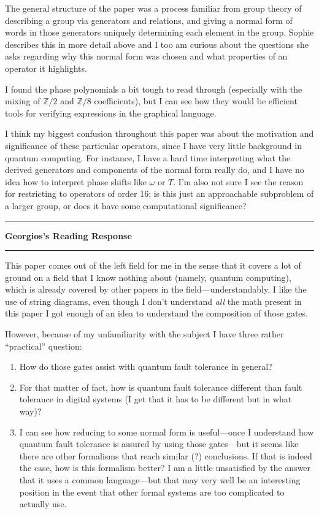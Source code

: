 \documentclass{amsart}
\newcommand{\iam}[1]{
  \vspace{0.25em}
  \hrule
  \vspace{0.25em}
  \textbf{{#1}'s Reading Response}
  \vspace{0.25em}
  \hrule
  \vspace{1em}
}
\begin{document}
The general structure of the paper was a process familiar from group theory of describing a group via generators and relations, and giving a normal form of words in those generators uniquely determining each element in the group.  Sophie describes this in more detail above and I too am curious about the questions she asks regarding why this normal form was chosen and what properties of an operator it highlights.

I found the phase polynomials a bit tough to read through (especially with the mixing of $\mathbb{Z}/2$ and $\mathbb{Z}/8$ coefficients), but I can see how they would be efficient tools for verifying expressions in the graphical language.

I think my biggest confusion throughout this paper was about the motivation and significance of these particular operators, since I have very little background in quantum computing.  For instance, I have a hard time interpreting what the derived generators and components of the normal form really do, and I have no idea how to interpret phase shifts like $\omega$ or $T$.  I'm also not sure I see the reason for restricting to operators of order 16; is this just an approachable subproblem of a larger group, or does it have some computational significance?

\iam{Georgios}

This paper comes out of the left field for me
in the sense that it covers a lot of ground
on a field that I know nothing about (namely, quantum computing),
which is already covered by other papers in the field---understandably.
I like the use of string diagrams, even though I don't understand \emph{all}
the math present in this paper I got enough of an idea
to understand the composition of those gates.

However, because of my unfamiliarity with the subject I have
three rather ``practical'' question:
\begin{enumerate}
\item How do those gates assist with quantum fault tolerance in general?
\item For that matter of fact, how is quantum fault tolerance different
  than fault tolerance in digital systems (I get that it has to be different
  but in what way)?
\item I can see how reducing to some normal form is useful---once
  I understand how quantum fault tolerance is assured by using those gates---but
  it seems like there are other formalisms that reach similar (?)
  conclusions. If that is indeed the case, how is this formalism better?
  I am a little unsatisfied by the answer that it uses a common language---but
  that may very well be an interesting position in the event that other
  formal systems are too complicated to actually use.
\end{enumerate}
\end{document}
